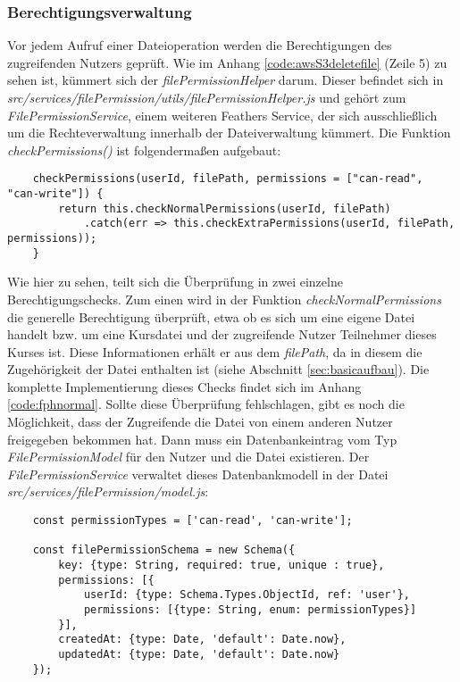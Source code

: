 \subsubsection{Berechtigungsverwaltung}
\label{sec:permissionsimpl}

Vor jedem Aufruf einer Dateioperation werden die Berechtigungen des zugreifenden Nutzers geprüft. Wie im Anhang \ref{code:awsS3deletefile} (Zeile 5) zu sehen ist, kümmert sich der \textit{filePermissionHelper} darum. Dieser befindet sich in \textit{src/services/filePermission/utils/filePermissionHelper.js} und gehört zum \textit{FilePermissionService}, einem weiteren Feathers Service, der sich ausschließlich um die Rechteverwaltung innerhalb der Dateiverwaltung kümmert. Die Funktion \textit{checkPermissions()} ist folgendermaßen aufgebaut:

\begin{lstlisting}
	checkPermissions(userId, filePath, permissions = ["can-read", "can-write"]) {
		return this.checkNormalPermissions(userId, filePath)
			.catch(err => this.checkExtraPermissions(userId, filePath, permissions));
	}
\end{lstlisting}

Wie hier zu sehen, teilt sich die Überprüfung in zwei einzelne Berechtigungschecks. Zum einen wird in der Funktion \textit{checkNormalPermissions} die generelle Berechtigung überprüft, etwa ob es sich um eine eigene Datei handelt bzw. um eine Kursdatei und der zugreifende Nutzer Teilnehmer dieses Kurses ist. Diese Informationen erhält er aus dem \textit{filePath}, da in diesem die Zugehörigkeit der Datei enthalten ist (siehe Abschnitt \ref{sec:basicaufbau}). Die komplette Implementierung dieses Checks findet sich im Anhang \ref{code:fphnormal}. Sollte diese Überprüfung fehlschlagen, gibt es noch die Möglichkeit, dass der Zugreifende die Datei von einem anderen Nutzer freigegeben bekommen hat. Dann muss ein Datenbankeintrag vom Typ \textit{FilePermissionModel} für den Nutzer und die Datei existieren. Der \textit{FilePermissionService} verwaltet dieses Datenbankmodell in der Datei \textit{src/services/filePermission/model.js}:

\begin{lstlisting}
	const permissionTypes = ['can-read', 'can-write'];
	
	const filePermissionSchema = new Schema({
		key: {type: String, required: true, unique : true},
		permissions: [{
			userId: {type: Schema.Types.ObjectId, ref: 'user'},
			permissions: [{type: String, enum: permissionTypes}]
		}],
		createdAt: {type: Date, 'default': Date.now},
		updatedAt: {type: Date, 'default': Date.now}
	});
\end{lstlisting}

